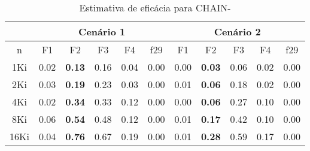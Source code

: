 \begin{table}[ht]
    \tiny
    \centering
    \caption{Estimativa de eficácia para CHAIN-\label{minus-chain-effect}}
    \begin{tabular}{c|ccccc|ccccc}
        \toprule
        & \multicolumn{5}{c}{Cenário 1} & \multicolumn{5}{c}{Cenário 2} \\
        \midrule
        n        & F1   & F2            & F3   & F4   & f29             & F1              & F2   & F3   & F4   & f29              \\
        \midrule
        1Ki      & 0.02 & \textbf{0.13} & 0.16 & 0.04 & \notfound{}0.00 & \notfound{}0.00 & \textbf{0.03} & 0.06 & 0.02 & \notfound{}0.00  \\
        2Ki      & 0.03 & \textbf{0.19} & 0.23 & 0.03 & \notfound{}0.00 & 0.01            & \textbf{0.06} & 0.18 & 0.02 & \notfound{}0.00  \\
        4Ki      & 0.02 & \textbf{0.34} & 0.33 & 0.12 & \notfound{}0.00 & \notfound{}0.00 & \textbf{0.06} & 0.27 & 0.10 & \notfound{}0.00  \\
        8Ki      & 0.06 & \textbf{0.54} & 0.48 & 0.12 & \notfound{}0.00 & 0.01            & \textbf{0.17} & 0.42 & 0.10 & \notfound{}0.00  \\
        16Ki     & 0.04 & \textbf{0.76} & 0.67 & 0.19 & \notfound{}0.00 & 0.01            & \textbf{0.28} & 0.59 & 0.17 & \notfound{}0.00  \\
        \bottomrule
    \end{tabular}
\end{table}
